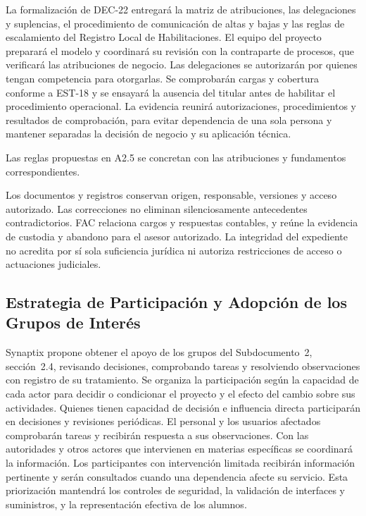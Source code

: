 La formalización de DEC-22 entregará la matriz de atribuciones, las delegaciones y suplencias, el procedimiento de comunicación de altas y bajas y las reglas de escalamiento del Registro Local de Habilitaciones. El equipo del proyecto preparará el modelo y coordinará su revisión con la contraparte de procesos, que verificará las atribuciones de negocio. Las delegaciones se autorizarán por quienes tengan competencia para otorgarlas. Se comprobarán cargas y cobertura conforme a EST-18 y se ensayará la ausencia del titular antes de habilitar el procedimiento operacional. La evidencia reunirá autorizaciones, procedimientos y resultados de comprobación, para evitar dependencia de una sola persona y mantener separadas la decisión de negocio y su aplicación técnica.

Las reglas propuestas en A2.5 se concretan con las
atribuciones y fundamentos correspondientes.

Los documentos y registros conservan origen, responsable,
versiones y acceso autorizado. Las correcciones no
eliminan silenciosamente antecedentes contradictorios.
FAC relaciona cargos y respuestas contables, y reúne
la evidencia de custodia y abandono para el asesor
autorizado. La integridad del expediente no acredita
por sí sola suficiencia jurídica ni autoriza restricciones
de acceso o actuaciones judiciales.

\subsection{Estrategia de Participación y Adopción de los Grupos de Interés}

Synaptix propone obtener el apoyo de los grupos del Subdocumento~2, sección~2.4, revisando decisiones, comprobando tareas y resolviendo observaciones con registro de su tratamiento. Se organiza la participación según la capacidad de cada actor para decidir o condicionar el proyecto y el efecto del cambio sobre sus actividades. Quienes tienen capacidad de decisión e influencia directa participarán en decisiones y revisiones periódicas. El personal y los usuarios afectados comprobarán tareas y recibirán respuesta a sus observaciones. Con las autoridades y otros actores que intervienen en materias específicas se coordinará la información. Los participantes con intervención limitada recibirán información pertinente y serán consultados cuando una dependencia afecte su servicio. Esta priorización mantendrá los controles de seguridad, la validación de interfaces y suministros, y la representación efectiva de los alumnos.

